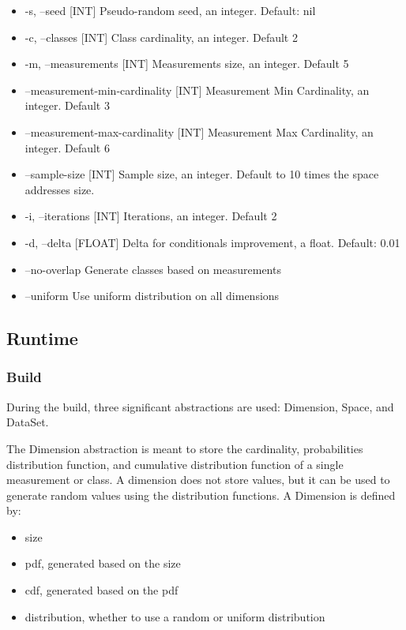 \documentclass[letterpaper, conference]{IEEEtran}
\begin{document}
\begin{itemize}
    \item-s, --seed [INT]                 Pseudo-random seed, an integer. Default: nil
    \item-c, --classes [INT]              Class cardinality, an integer. Default 2
    \item-m, --measurements [INT]         Measurements size, an integer. Default 5
    \item    --measurement-min-cardinality [INT]
                                     Measurement Min Cardinality, an integer. Default 3
    \item    --measurement-max-cardinality [INT]
                                     Measurement Max Cardinality, an integer. Default 6
    \item    --sample-size [INT]          Sample size, an integer. Default to 10 times the  space addresses size.
    \item-i, --iterations [INT]           Iterations, an integer. Default 2
    \item-d, --delta [FLOAT]              Delta for conditionals improvement, a float. Default: 0.01
    \item    --no-overlap                 Generate classes based on measurements
    \item    --uniform                    Use uniform distribution on all dimensions
\end{itemize}

\subsection{Runtime}

\subsubsection{Build}

During the build, three significant abstractions are used: Dimension, Space, and DataSet.

The Dimension abstraction is meant to store the cardinality, probabilities distribution function, and cumulative distribution function of a single measurement or class. A dimension does not store values, but it can be used to generate random values using the distribution functions. A Dimension is defined by:

\begin{itemize}
  \item size
  \item pdf, generated based on the size
  \item cdf, generated based on the pdf
  \item distribution, whether to use a random or uniform distribution
\end{itemize}
\end{document}
